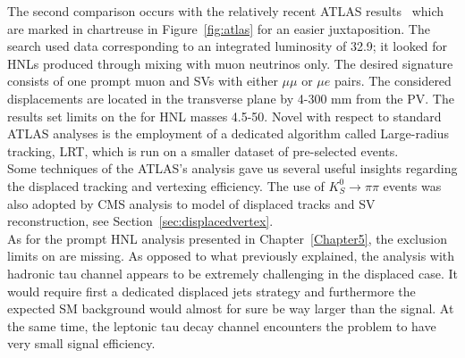The second comparison occurs with the relatively recent ATLAS
results~\cite{atlas_ll} which are marked in chartreuse in
Figure~\ref{fig:atlas} for an easier juxtaposition. The search used
data corresponding to an integrated
luminosity of 32.9\fbinv; it looked for HNLs produced through mixing with
muon neutrinos only. The desired signature consists of one prompt muon and SVs
with either $\mu \mu$ or $\mu e$ pairs. The considered displacements
are located in the transverse plane by 4-300 mm from the PV. The
results set limits on the \mixparm for HNL masses 4.5-50\GeV. Novel
with respect to standard ATLAS analyses is the employment of a
dedicated algorithm called Large-radius tracking, LRT, which is run on
a smaller dataset of pre-selected events.\\
Some techniques of the ATLAS's analysis gave us several useful
insights regarding the displaced tracking and vertexing
efficiency. The use of $K_S^{0} \rightarrow \pi \pi$ events was also
adopted by CMS analysis to model of displaced tracks
and SV reconstruction, see Section~\ref{sec:displacedvertex}.\\

As for the prompt HNL analysis presented in Chapter~\ref{Chapter5},
the exclusion limits on \mixpart are missing. As opposed to what
previously explained, the analysis with hadronic tau channel appears
to be extremely challenging in the displaced case. It would require
first a
dedicated displaced jets strategy and furthermore the expected SM background would almost
for sure be way larger than the signal.
At the same time, the leptonic tau decay channel encounters the
problem to have very small
signal efficiency.


\vspace{2cm}

